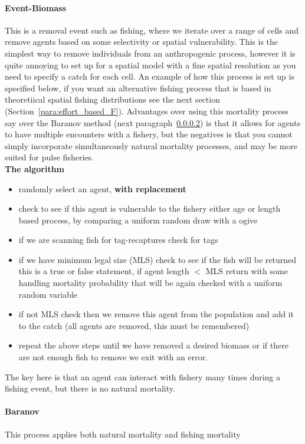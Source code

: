 \paragraph{Event-Biomass}\label{para:event_mort}
This is a removal event such as fishing, where we iterate over a range of cells and remove agents based on some selectivity or spatial vulnerability. This is the simplest way to remove individuals from an anthropogenic process, however it is quite annoying to set up for a spatial model with a fine spatial resolution as you need to specify a catch for each cell. An example of how this process is set up is specified below, if you want an alternative fishing process that is based in theoretiical spatial fishing distributions see the next section (Section~\ref{para:effort_based_F}). Advantages over using this mortality process say over the Baranov method (next paragraph~\ref{para:baranov}) is that it allows for agents to have multiple encounters with a fishery, but the negatives is that you cannot simply incorporate simultaneously natural mortality processes, and may be more suited for pulse fisheries.\\

\textbf{The algorithm}
\begin{itemize}
	\item randomly select an agent, \textbf{with replacement}
	\item check to see if this agent is vulnerable to the fishery either age or length based process, by comparing a uniform random draw with a ogive
	\item if we are scanning fish for tag-recaptures check for tags
	\item if we have minimum legal size (MLS) check to see if the fish will be returned this is a true or false statement, if agent length $<$ MLS return with some handling mortality probability that will be again checked with a uniform random variable
	\item if not MLS check then we remove this agent from the population and add it to the catch (all agents are removed, this must be remembered)
	\item repeat the above steps until we have removed a desired biomass or if there are not enough fish to remove we exit with an error.
\end{itemize}
The key here is that an agent can interact with fishery many times during a fishing event, but there is no natural mortality.


\paragraph{Baranov}\label{para:baranov}
This process applies both natural mortality and fishing mortality

